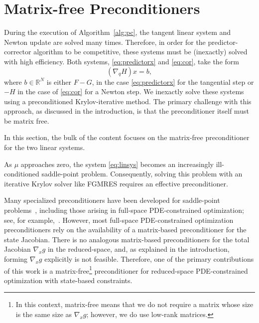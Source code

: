  
\chapter{Matrix-free Preconditioners}
During the execution of Algorithm~\ref{alg:pc}, the tangent linear system and
Newton update are solved many times.  Therefore, in order for the
predictor-corrector algorithm to be competitive, these systems must be
(inexactly) solved with high efficiency.  Both systems, \eqref{eq:predictorx}
and \eqref{eq:cor}, take the form
\begin{equation}\label{eq:linsys}
  (\nabla_q H) x = b,
\end{equation}
where $b \in
\mathbb{R}^{N}$ is either $F - G$, in the case \eqref{eq:predictorx} for the tangential step or $-H$ in the case of \eqref{eq:cor} for a Newton step.  We inexactly solve these systems using a preconditioned
Krylov-iterative method.  The primary challenge with this approach, as discussed
in the introduction, is that the preconditioner itself must be matrix free.

In this section, the bulk of the content focuses on
the matrix-free preconditioner for the two linear systems. 


As $\mu$ approaches zero, the system \eqref{eq:linsys} becomes an increasingly
ill-conditioned saddle-point problem.  Consequently, solving this problem with
an iterative Krylov solver like FGMRES requires an effective preconditioner.

Many specialized preconditioners have been developed for saddle-point
problems~\cite{benzi2005numerical}, including those arising in full-space
PDE-constrained optimization; see, for example,~\cite{Rees2010optimal}.
However, most full-space PDE-constrained optimization preconditioners rely on
the availability of a matrix-based preconditioner for the state Jacobian. There
is no analogous matrix-based preconditioners for the total Jacobian $\nabla_x g$
in the reduced-space, and, as explained in the introduction, forming $\nabla_x
g$ explicitly is not feasible.  Therefore, one of the primary contributions of
this work is a matrix-free\footnote{In this context, matrix-free means that we
  do not require a matrix whose size is the same size as $\nabla_x g$; however,
  we do use low-rank matrices.} preconditioner for reduced-space PDE-constrained
optimization with state-based constraints.

